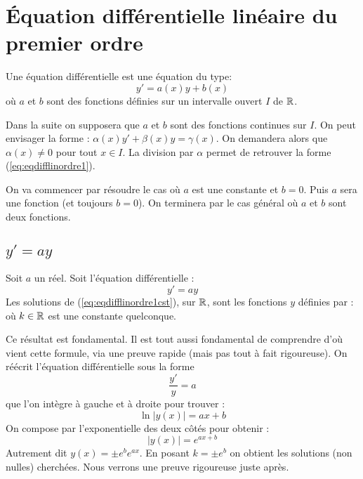 \documentclass[class=report,crop=false]{standalone}
\begin{document}
\section{Équation différentielle linéaire du premier ordre}

\begin{definition}
Une équation différentielle  est une équation du type:
\begin{equation}
  y'=a(x)y + b(x)
  \label{eq:eqdifflinordre1}
  \tag{$E$}
\end{equation}
où $a$ et $b$ sont des fonctions définies sur un intervalle ouvert $I$ de $\mathbb{R}$.
\end{definition}


Dans la suite on supposera que $a$ et $b$ sont des fonctions continues sur $I$.
On peut envisager la forme :
$\alpha (x)y'+\beta (x)y=\gamma (x)$.
On demandera alors que $\alpha (x)\neq 0$ pour tout $x\in I$.
La division par $\alpha $ permet de retrouver la forme (\ref{eq:eqdifflinordre1}).

\bigskip

On va commencer par résoudre le cas où $a$ est une constante et $b=0$.
Puis $a$ sera une fonction (et toujours $b=0$).
On terminera par le cas général où $a$ et $b$ sont deux fonctions.

\subsection{$y'=ay$}

\begin{theoreme}
\label{th:eqdifflinordre1cst}
Soit $a$ un réel. Soit l'équation différentielle :
\begin{equation}
   y' = a y
  \label{eq:eqdifflinordre1cst}
  \tag{$E$}
\end{equation}
Les solutions de (\ref{eq:eqdifflinordre1cst}), sur $\mathbb{R}$, sont les fonctions $y$ définies par :
où $k\in \mathbb{R}$ est une constante quelconque.
\end{theoreme}


Ce résultat est fondamental. Il est tout aussi fondamental de
comprendre d'où vient cette formule, via une preuve rapide
(mais pas tout à fait rigoureuse). On réécrit l'équation
différentielle sous la forme
$$\frac{y'}{y} =  a$$
que l'on intègre à gauche et à droite pour trouver :
$$\ln |y(x)| = ax+b$$
On compose par l'exponentielle des deux côtés pour obtenir :
$$|y(x)| = e^{ax+b}$$
Autrement dit  $y(x) = \pm e^b e^{ax}$.
En posant $k = \pm e^b$ on obtient les solutions (non nulles) cherchées.
Nous verrons une preuve rigoureuse juste après.
\end{document}
